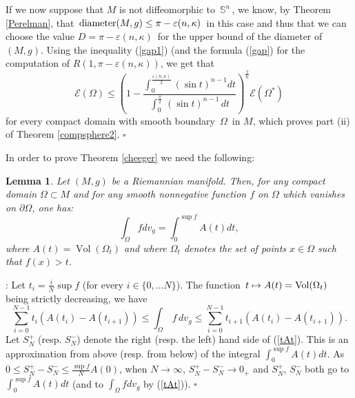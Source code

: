 \documentclass[11pt, reqno]{amsart}
\newtheorem{lemme}[theoreme]{Lemma}
\theoremstyle{plain}
\begin{document}
If we now suppose that $M$ is not diffeomorphic to $\,\mathbb S^n\,$, we
know, by Theorem \ref{Perelman}, that $\,{\rm diameter} (M,g) \leq \pi - \varepsilon (n , \kappa)\,$ in this case
and thus that we can choose the value 
$D = \pi - \varepsilon (n , \kappa)\,$ for the upper bound of the diameter of $(M, g)$.
Using the inequality (\ref{gap1}) (and the formula (\ref{gap}) for the computation of
$R(1, \pi - \varepsilon (n , \kappa) )$, we get that
$${\mathcal E} (\Omega) \leq  \left( 1 - \dfrac{\int_0^{\frac{\varepsilon (n , \kappa)}{2}} (\sin t)^{n-1} dt}
{\int_0^{\frac{\pi}{2}}\, (\sin t)^{n-1}\, dt}\right)^{\frac{2}{n}}{\mathcal E} (\Omega^*)$$
for every compact domain with smooth boundary $\,\Omega \,$ in $M$, which proves 
part (ii) of  Theorem \ref{compsphere2}.  $\square$

In order to prove Theorem \ref{cheeger} we need the following:

\begin{lemme}\label{lemmacheeger}
Let $(M, g)$ be a Riemannian manifold. Then, for any compact domain $\Omega\subset M$ and for any smooth nonnegative function 
$f$ on $\Omega$ which vanishes on $\partial\Omega$, one has:
$$\int_{\Omega}fdv_g=\int_0^{\sup f}A(t)dt,$$
where $A(t)={\operatorname{Vol}} (\Omega_t)$ and  where $\Omega_t$ denotes the set of points $x\in\Omega$ such that $f(x)>t$.
\end{lemme}
: 
Let $t_i=\frac{i}{N}\sup f$ (for every $i\in \{0, \dots N\}$).
The function $\, t \mapsto A(t) = {\rm Vol} (\Omega_t)\,$ being 
strictly decreasing, we have
\begin{equation}\label{tAt}
\sum_{i = 0}^{N-1} t_i  \left( A(t_i) - A(t_{i+1}) \right) \le \int_\Omega \, f\, dv_g 
\le \sum_{i = 0}^{N-1} t_{i+1}  \left( A(t_i) - A(t_{i+1}) \right) .
\end{equation}
Let   $S^+_N$ (resp. $S^{-}_N$) denote the right (resp. the left)
hand side of (\ref{tAt}).
This is an approximation from above (resp. from below) of the integral 
$\int_0^{\sup f}A(t)dt$.
As $0\leq S^+_N-S^-_N\leq\frac{\sup f}{N}A(0)$, when $N\rightarrow\infty$, 
$S^+_N-S^-_N\rightarrow 0_+$ and $S^+_N$, $S^-_N$ both go to 
$\int_0^{\sup f}A(t)dt$ (and to $\int_{\Omega}fdv_g$ by (\ref{tAt})).
$\square$

\vskip 0.3cm
\end{document}
